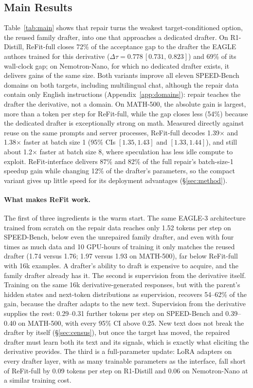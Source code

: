 \documentclass[11pt]{article}
\newcommand{\refit}{ReFit}
\newcommand{\refitI}{ReFit-interface}
\newcommand{\refitF}{ReFit-full}
\newcommand{\ci}[2]{\,[#1,\,#2]}
\begin{document}
\subsection{Main Results}

Table~\ref{tab:main} shows that repair turns the weakest target-conditioned option, the reused family drafter, into one that approaches a dedicated drafter.
On R1-Distill, \refitF{} closes 72\% of the acceptance gap to the drafter the EAGLE authors trained for this derivative ($\Delta\tau = 0.778\ci{0.731}{0.823}$) and 69\% of its wall-clock gap; on Nemotron-Nano, for which no dedicated drafter exists, it delivers gains of the same size.
Both variants improve all eleven SPEED-Bench domains on both targets, including multilingual chat, although the repair data contain only English instructions (Appendix~\ref{app:domains}): repair teaches the drafter the derivative, not a domain.
On MATH-500, the absolute gain is largest, more than a token per step for \refitF{}, while the gap closes less (54\%) because the dedicated drafter is exceptionally strong on math.
Measured directly against reuse on the same prompts and server processes, \refitF{} decodes 1.39$\times$ and 1.38$\times$ faster at batch size 1 (95\% CIs $[1.35, 1.43]$ and $[1.33, 1.44]$), and still about 1.2$\times$ faster at batch size 8, where speculation has less idle compute to exploit.
\refitI{} delivers 87\% and 82\% of the full repair's batch-size-1 speedup gain while changing 12\% of the drafter's parameters, so the compact variant gives up little speed for its deployment advantages (\S\ref{sec:method}).

\paragraph{What makes \refit{} work.}
The first of three ingredients is the warm start.
The same EAGLE-3 architecture trained from scratch on the repair data reaches only 1.52 tokens per step on SPEED-Bench, below even the unrepaired family drafter, and even with four times as much data and 10 GPU-hours of training it only matches the reused drafter (1.74 versus 1.76; 1.97 versus 1.93 on MATH-500), far below \refitF{} with 16k examples.
A drafter's ability to draft is expensive to acquire, and the family drafter already has it.
The second is supervision from the derivative itself.
Training on the same 16k derivative-generated responses, but with the parent's hidden states and next-token distributions as supervision, recovers 54--62\% of the gain, because the drafter adapts to the new text.
Supervision from the derivative supplies the rest: 0.29--0.31 further tokens per step on SPEED-Bench and 0.39--0.40 on MATH-500, with every 95\% CI above 0.25.
New text does not break the drafter by itself (\S\ref{sec:census}), but once the target has moved, the repaired drafter must learn both its text and its signals, which is exactly what eliciting the derivative provides.
The third is a full-parameter update: LoRA adapters on every drafter layer, with as many trainable parameters as the interface, fall short of \refitF{} by 0.09 tokens per step on R1-Distill and 0.06 on Nemotron-Nano at a similar training cost.
\end{document}

